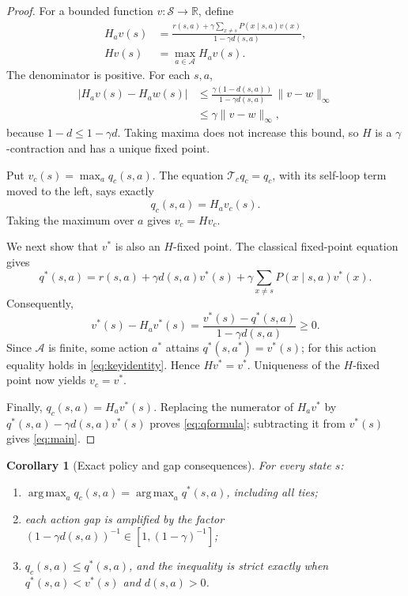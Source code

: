 \documentclass[11pt]{article}
\newtheorem{corollary}[theorem]{Corollary}
\newcommand{\A}{\mathcal A}
\newcommand{\Sset}{\mathcal S}
\newcommand{\Tc}{\mathcal T_{\!c}}
\begin{document}
\begin{proof}
For a bounded function $v:\Sset\to\mathbb R$, define
\begin{align*}
 H_a v(s)
   &=\frac{r(s,a)+\gamma\sum_{x\neq s}P(x\mid s,a)v(x)}
           {1-\gamma d(s,a)},\\
 Hv(s)&=\max_{a\in\A}H_a v(s).
\end{align*}
The denominator is positive.  For each $s,a$,
\begin{align*}
 |H_a v(s)-H_a w(s)|
 &\leq
 \frac{\gamma(1-d(s,a))}{1-\gamma d(s,a)}\,
 \|v-w\|_\infty\\
 &\leq \gamma\|v-w\|_\infty,
\end{align*}
because $1-d\leq 1-\gamma d$.  Taking maxima does not increase this bound,
so $H$ is a $\gamma$-contraction and has a unique fixed point.

Put $v_c(s)=\max_a q_c(s,a)$.  The equation $\Tc q_c=q_c$, with its
self-loop term moved to the left, says exactly
\[
 q_c(s,a)=H_a v_c(s).
\]
Taking the maximum over $a$ gives $v_c=Hv_c$.

We next show that $v^*$ is also an $H$-fixed point.  The classical fixed-point
equation gives
\[
 q^*(s,a)=r(s,a)+\gamma d(s,a)v^*(s)
      +\gamma\sum_{x\neq s}P(x\mid s,a)v^*(x).
\]
Consequently,
\begin{equation}\label{eq:keyidentity}
 v^*(s)-H_a v^*(s)
 =\frac{v^*(s)-q^*(s,a)}{1-\gamma d(s,a)}\geq0.
\end{equation}
Since $\A$ is finite, some action $a^*$ attains
$q^*(s,a^*)=v^*(s)$; for this action equality holds in
\eqref{eq:keyidentity}.  Hence $Hv^*=v^*$.  Uniqueness of the $H$-fixed point
now yields $v_c=v^*$.

Finally, $q_c(s,a)=H_a v^*(s)$.  Replacing the numerator of $H_a v^*$ by
$q^*(s,a)-\gamma d(s,a)v^*(s)$ proves \eqref{eq:qformula}; subtracting it
from $v^*(s)$ gives \eqref{eq:main}.
\end{proof}

\begin{corollary}[Exact policy and gap consequences]
For every state $s$:
\begin{enumerate}
\item $\operatorname*{arg\,max}_a q_c(s,a)
      =\operatorname*{arg\,max}_a q^*(s,a)$, including all ties;
\item each action gap is amplified by the factor
      $(1-\gamma d(s,a))^{-1}\in[1,(1-\gamma)^{-1}]$;
\item $q_c(s,a)\leq q^*(s,a)$, and the inequality is strict exactly when
      $q^*(s,a)<v^*(s)$ and $d(s,a)>0$.
\end{enumerate}
\end{corollary}
\end{document}
